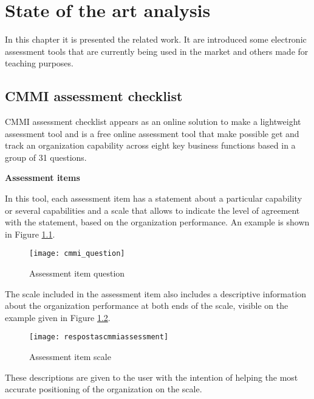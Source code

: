 \chapter{State of the art analysis}\label{chap:chap3}

In this chapter it is presented the related work. It are introduced  some electronic assessment tools that are currently being used in the market and others made for teaching purposes.

\section{CMMI assessment checklist}

CMMI assessment checklist \citep{capabilityassess} appears as an online solution to make a lightweight assessment tool and is a free online assessment tool that make possible get and track an organization capability across eight key business functions based in a group of 31 questions.


\textbf{Assessment items}

In this tool, each assessment item has a statement about a particular capability or several capabilities and a scale that allows to indicate the level of agreement with the statement, based on the organization performance. An example is shown in Figure \ref{fig:cmmi_question}.

\begin{figure}[h]
	\begin{center}
		\leavevmode
		\texttt{[image: cmmi\_question]}
		\caption{Assessment item question}
		\label{fig:cmmi_question}
	\end{center}
\end{figure}

The scale included in the assessment item also includes a descriptive information about the organization performance at both ends of the scale, visible on the example given in Figure \ref{fig:assesment_answer}.

\begin{figure}[h]
	\begin{center}
		\leavevmode
		\texttt{[image: respostascmmiassessment]}
		\caption{Assessment item scale}
		\label{fig:assesment_answer}
	\end{center}
\end{figure}

These descriptions are given to the user with the intention of helping the most accurate positioning of the organization on the scale.

